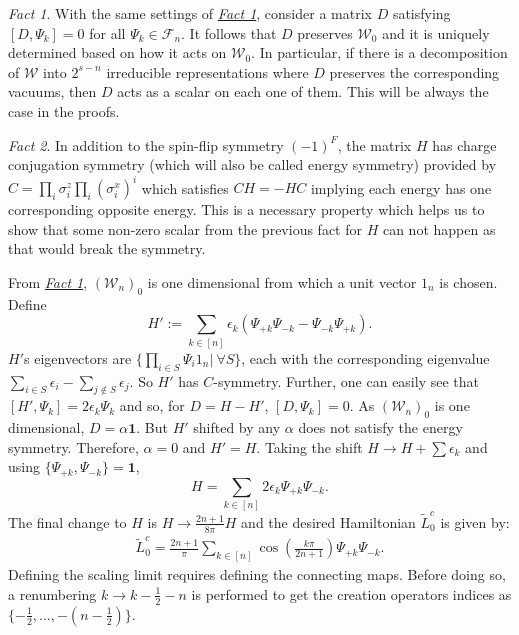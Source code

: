 \documentclass[twoside,11pt,titlepage]{amsart}
\renewcommand{\=}[1]{\stackrel{#1}{=}} %
\theoremstyle{definition}
\theoremstyle{remark}
\newtheorem{fct}{Fact}
\begin{document}
\begin{fct}\label{fct2}
With the same settings of \hyperref[fct1]{\textit{Fact 1}}, consider a matrix $D$ satisfying $[D,\Psi_k]=0$ for all $\Psi_k \in \mathcal{F}_n$. It follows that $D$ preserves $\mathcal{W}_0$ and it is uniquely determined based on how it acts on $\mathcal{W}_0$. In particular, if there is a decomposition of $\mathcal{W}$ into $2^{s-n}$ irreducible representations where $D$ preserves the corresponding vacuums, then $D$ acts as a scalar on each one of them. This will be always the case in the proofs.
\end{fct}

\begin{fct}\label{fct3}
In addition to the spin-flip symmetry $(-1)^F$, the matrix $H$ has charge conjugation symmetry (which will also be called energy symmetry) provided by $C=\prod_i \sigma_i^z \prod_i (\sigma_i^x)^i$ which satisfies $CH=-HC$ implying each energy has one corresponding opposite energy. This is a necessary property which helps us to show that some non-zero scalar from the previous fact for $H$ can not happen as that would break the symmetry.
\end{fct} 
From \hyperref[fct1]{\textit{Fact 1}}, $(\mathcal{W}_n)_0$ is one dimensional from which a unit vector $1_n$ is chosen. Define
$$H':= \sum_{k\in [n]} \epsilon_k(\Psi_{+k}\Psi_{-k}-\Psi_{-k}\Psi_{+k}).$$
$H'$s eigenvectors are $\{\prod_{i \in S} \Psi_{i}1_n|\ \forall S\}$, each with the corresponding eigenvalue $\sum_{i \in S} \epsilon_i - \sum_{j \not \in S} \epsilon_j$. So $H'$ has $C$-symmetry. Further, one can easily see that $[H',\Psi_k]=2\epsilon_k\Psi_k$ and so, for  $D=H-H'$, $[D,\Psi_k]=0$. As  $(\mathcal{W}_n)_0$ is one dimensional, $D=\alpha\textbf{1}$. But $H'$ shifted by any $\alpha$ does not satisfy the energy symmetry. Therefore, $\alpha=0$ and $H'=H$. Taking the shift $H \rightarrow H+ \sum \epsilon_k$ and using $\{\Psi_{+k},\Psi_{-k}\}=\textbf{1}$,
$$H=\sum_{k \in [n]} 2\epsilon_k\Psi_{+k}\Psi_{-k}.$$
The final change to $H$ is $H \rightarrow \frac{2n+1}{8\pi}H$ and the desired Hamiltonian $\widetilde{L}_0^c$ is given by:
\begin{align}\label{eq17}
\widetilde{L}_0^c=\frac{2n+1}{\pi}\sum_{k \in [n]} \cos(\frac{k\pi}{2n+1})\Psi_{+k}\Psi_{-k}.
\end{align}
Defining the scaling limit requires defining the connecting maps. Before doing so, a renumbering $k \rightarrow k-\frac{1}{2}-n$ is performed to get the creation operators indices as $\{-\frac{1}{2},\ldots,-(n-\frac{1}{2})\}$. 
\end{document}
